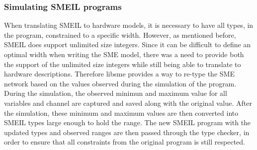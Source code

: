 \subsubsection{Simulating SMEIL programs}
When translating SMEIL to hardware models, it is necessary to have all types, in the program, constrained to a specific width. However, as mentioned before, SMEIL does support unlimited size integers. Since it can be difficult to define an optimal width when writing the SME model, there was a need to provide both the support of the unlimited size integers while still being able to translate to hardware descriptions.
Therefore libsme provides a way to re-type the SME network based on the values observed during the simulation of the program.
During the simulation, the observed minimun and maximum value for all variables and channel are captured and saved along with the original value.
After the simulation, these minimum and maximum values are then converted into SMEIL types large enough to hold the range.
The new SMEIL program with the updated types and observed ranges are then passed through the type checker, in order to ensure that all constraints from the original program is still respected.


